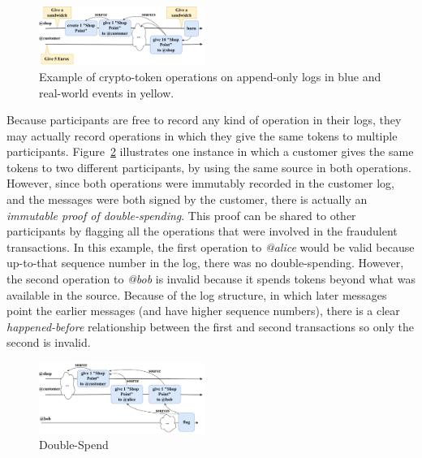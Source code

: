 \documentclass[sigplan,screen,10pt]{acmart}
\begin{document}
\begin{figure}[htbp]
\centering
\includegraphics[width=0.48\textwidth]{./figures/example-drawio}
\caption{Example of crypto-token operations on append-only logs in blue and real-world events in yellow.}
\label{figure:example}
\end{figure}

Because participants are free to record any kind of operation in their logs, they may actually record operations in which they give the same tokens to multiple participants. Figure~\ref{figure:double-spend} illustrates one instance in which a customer gives the same tokens to two different participants, by using the same source in both operations. However, since both operations were immutably recorded in the customer log, and the messages were both signed by the customer, there is actually an \textit{immutable proof of double-spending}. This proof can be shared to other participants by flagging all the operations that were involved in the fraudulent transactions. In this example, the first operation to \textit{@alice} would be valid because up-to-that sequence number in the log, there was no double-spending. However, the second operation to \textit{@bob} is  invalid because it spends tokens beyond what was available in the source. Because of the log structure, in which later messages point the earlier messages (and have higher sequence numbers), there is a clear \textit{happened-before} relationship between the first and second transactions so only the second is invalid.

\begin{figure}[htbp]
\includegraphics[width=0.48\textwidth]{figures/double-spend-drawio}
\caption{Double-Spend}
\label{figure:double-spend}
\end{figure}
\end{document}
